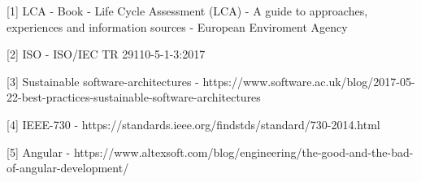 [1] LCA - Book - Life Cycle Assessment (LCA) - A guide to approaches, experiences and information sources - European Enviroment Agency 

[2] ISO - ISO/IEC TR 29110-5-1-3:2017 

[3] Sustainable software-architectures -  https://www.software.ac.uk/blog/2017-05-22-best-practices-sustainable-software-architectures 

[4] IEEE-730 - https://standards.ieee.org/findstds/standard/730-2014.html 

[5] Angular - https://www.altexsoft.com/blog/engineering/the-good-and-the-bad-of-angular-development/ 

